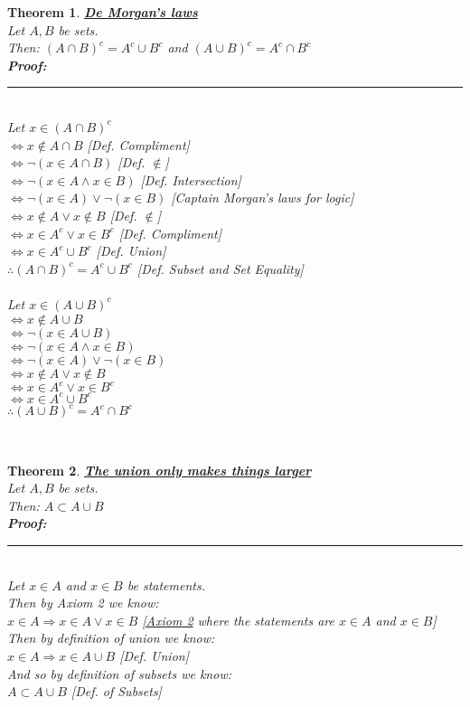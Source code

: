 \documentclass[12pt]{extarticle}
\theoremstyle{plain}
\newtheorem{thm}{Theorem}[section]
\theoremstyle{plain}
\theoremstyle{plain}
\theoremstyle{Definition}
\theoremstyle{Definition}
\theoremstyle{plain}
\theoremstyle{plain}
\newcommand{\cut}[0]{\noindent\framebox[\linewidth]{\rule{\linewidth}{2pt}}\\}
\newcommand{\prof}[0]{	\noindent \textbf{Proof:} \rule{500pt}{2pt} \\ }
\begin{document}
\begin{thm} \underline{\textbf{De Morgan's laws}} \\
	Let $A,B$ be sets. \\ 
	Then: $(A \cap B)^c = A^c \cup B^c$ and $(A \cup B)^c = A^c \cap B^c$ \\ 
	\prof 
	Let $x \in (A \cap B)^c$ \\
	$\Leftrightarrow x \not \in A \cap B$ \hfill [Def. Compliment]\\ 
	$\Leftrightarrow \lnot(x \in A \cap B)$ \hfill [Def. $\not \in$]\\ 
	$\Leftrightarrow \lnot(x \in A \land x \in B)$ \hfill [Def. Intersection]\\
	$\Leftrightarrow \lnot (x \in A) \lor \lnot (x \in B)$ \hfill [Captain Morgan's laws for logic]\\
	$\Leftrightarrow x \not\in A \lor x \not\in B$ \hfill [Def. $\not \in$]\\
	$\Leftrightarrow x \in A^c \lor x \in B^c$ \hfill [Def. Compliment]\\ 
	$\Leftrightarrow x \in A^c \cup B^c$ \hfill [Def. Union]\\ 
	$\therefore (A \cap B)^c = A^c \cup B^c$ \hfill [Def. Subset and Set Equality]\\ \\ 
	Let $x \in (A \cup B)^c$ \\ 
	$\Leftrightarrow x \not \in A \cup B$ \\
	$\Leftrightarrow \lnot (x \in A \cup B)$ \\ 
	$\Leftrightarrow \lnot (x \in A \land x \in B)$ \\ 
	$\Leftrightarrow \lnot (x \in A) \lor \lnot (x \in B)$ \\ 
	$\Leftrightarrow x \not \in A \lor x \not \in B$ \\ 
	$\Leftrightarrow x \in A^c \lor x \in B^c$ \\ 
	$\Leftrightarrow x \in A^c \cup B^c$ \\
	$\therefore (A \cup B)^c = A^c \cap B^c$ \\ 
\end{thm}
\cut
\begin{thm} \underline{\textbf{The union only makes things larger}} \\
	Let $A,B$ be sets. \\ 
	Then: $A \subset A \cup B$ \\ 
	\prof 
	Let $x \in A$ and $x\in B$ be statements. \\
	Then by Axiom 2 we know: \\ 
	$x \in A \Rightarrow x \in A \lor x \in B$  \hfill \hyperlink{Axioms}{[Axiom 2} where the statements are $x \in A$ and $x \in B$] \\ 
	Then by definition of union we know: \\ 
	$x \in A \Rightarrow x \in A \cup B$ \hfill [Def. Union] \\
	And so by definition of subsets we know: \\ 
	$A \subset A \cup B$ \hfill [Def. of Subsets] \\
\end{thm}
\end{document}
